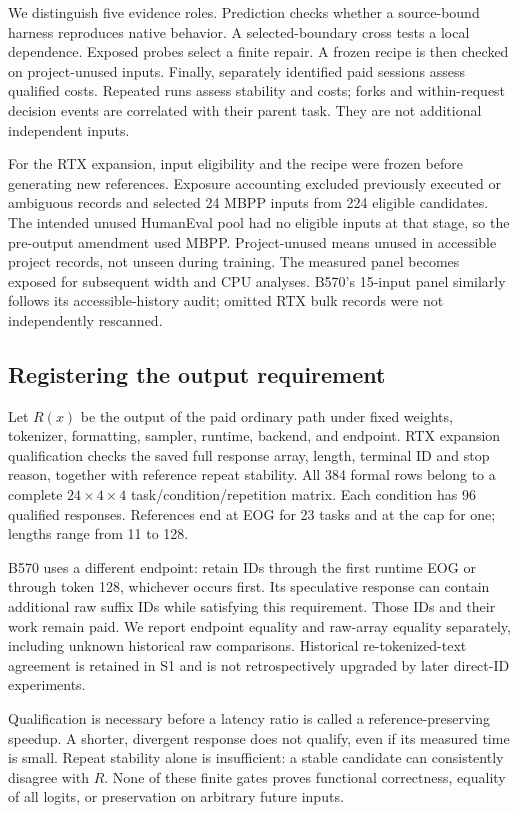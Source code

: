 We distinguish five evidence roles. Prediction checks whether a source-bound harness reproduces native behavior. A selected-boundary cross tests a local dependence. Exposed probes select a finite repair. A frozen recipe is then checked on project-unused inputs. Finally, separately identified paid sessions assess qualified costs. Repeated runs assess stability and costs; forks and within-request decision events are correlated with their parent task. They are not additional independent inputs.

For the RTX expansion, input eligibility and the recipe were frozen before generating new references. Exposure accounting excluded previously executed or ambiguous records and selected 24 MBPP inputs from 224 eligible candidates. The intended unused HumanEval pool had no eligible inputs at that stage, so the pre-output amendment used MBPP. Project-unused means unused in accessible project records, not unseen during training. The measured panel becomes exposed for subsequent width and CPU analyses. B570's 15-input panel similarly follows its accessible-history audit; omitted RTX bulk records were not independently rescanned.

\subsection{Registering the output requirement}
Let $R(x)$ be the output of the paid ordinary path under fixed weights, tokenizer, formatting, sampler, runtime, backend, and endpoint. RTX expansion qualification checks the saved full response array, length, terminal ID and stop reason, together with reference repeat stability. All 384 formal rows belong to a complete $24\times4\times4$ task/condition/repetition matrix. Each condition has 96 qualified responses. References end at EOG for 23 tasks and at the cap for one; lengths range from 11 to 128.

B570 uses a different endpoint: retain IDs through the first runtime EOG or through token 128, whichever occurs first. Its speculative response can contain additional raw suffix IDs while satisfying this requirement. Those IDs and their work remain paid. We report endpoint equality and raw-array equality separately, including unknown historical raw comparisons. Historical re-tokenized-text agreement is retained in S1 and is not retrospectively upgraded by later direct-ID experiments.

Qualification is necessary before a latency ratio is called a reference-preserving speedup. A shorter, divergent response does not qualify, even if its measured time is small. Repeat stability alone is insufficient: a stable candidate can consistently disagree with $R$. None of these finite gates proves functional correctness, equality of all logits, or preservation on arbitrary future inputs.

